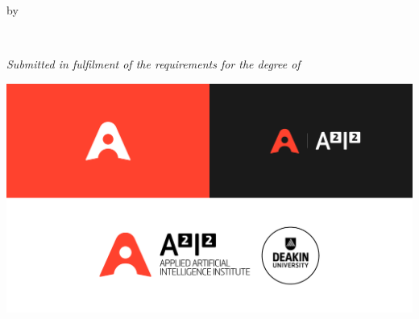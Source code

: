 
\vspace*{\fill}
\thispagestyle{empty}

\centering

\Large
\textbf{\themaintitle}
\vspace{0.9 cm}

\normalsize by

\medskip
\Large \theauthor{}\\
\normalsize \theauthorspostnominals{}
\vspace{0.75 cm}

%
\itshape
Submitted in fulfilment of the requirements for the degree of\\
\upshape
\thedegree

\vspace{2 cm}
\includegraphics[width=.8\linewidth]{frontmatter/figures/a2i2}
\vspace{2 cm}

\upshape\large
\thedepartment{}\\
\theinstitution{}\\

\vspace{1cm}
\thedate{}
\vspace*{\fill}

\justify
\normalsize
\restoregeometry